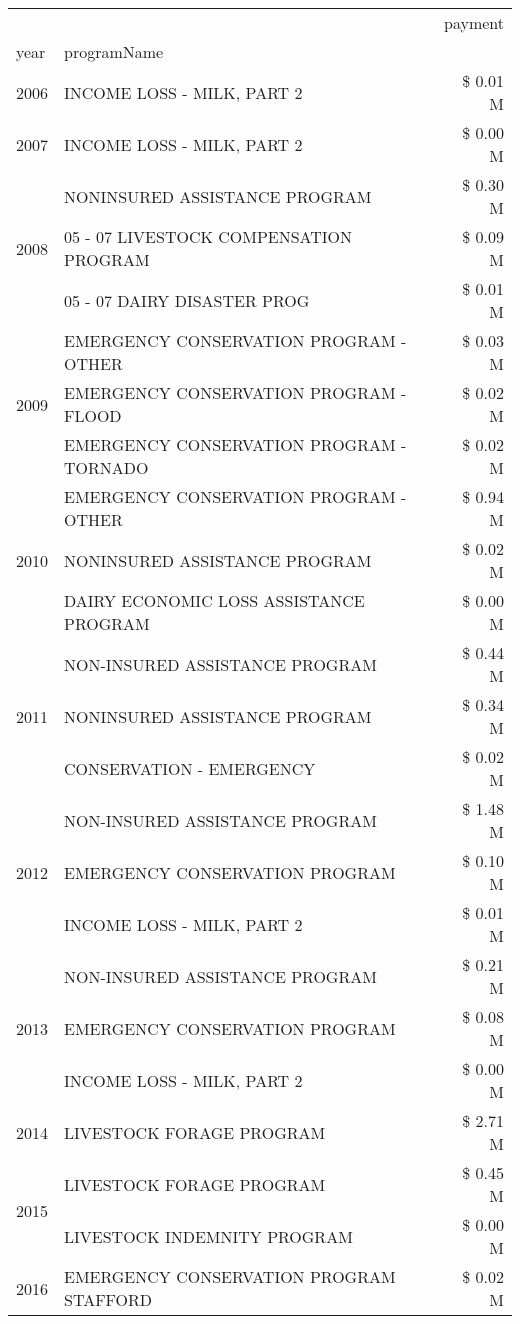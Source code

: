 \begin{tabular}{llr}
\toprule
 &  & payment \\
year & programName &  \\
\midrule
2006 & INCOME LOSS - MILK, PART 2 & \$ 0.01 M \\
\cline{1-3}
2007 & INCOME LOSS - MILK, PART 2 & \$ 0.00 M \\
\cline{1-3}
\multirow[t]{3}{*}{2008} & NONINSURED ASSISTANCE PROGRAM & \$ 0.30 M \\
 & 05 - 07 LIVESTOCK COMPENSATION PROGRAM & \$ 0.09 M \\
 & 05 - 07 DAIRY DISASTER PROG & \$ 0.01 M \\
\cline{1-3}
\multirow[t]{3}{*}{2009} & EMERGENCY CONSERVATION PROGRAM - OTHER & \$ 0.03 M \\
 & EMERGENCY CONSERVATION PROGRAM - FLOOD & \$ 0.02 M \\
 & EMERGENCY CONSERVATION PROGRAM - TORNADO & \$ 0.02 M \\
\cline{1-3}
\multirow[t]{3}{*}{2010} & EMERGENCY CONSERVATION PROGRAM - OTHER & \$ 0.94 M \\
 & NONINSURED ASSISTANCE PROGRAM & \$ 0.02 M \\
 & DAIRY ECONOMIC LOSS ASSISTANCE PROGRAM & \$ 0.00 M \\
\cline{1-3}
\multirow[t]{3}{*}{2011} & NON-INSURED ASSISTANCE PROGRAM & \$ 0.44 M \\
 & NONINSURED ASSISTANCE PROGRAM & \$ 0.34 M \\
 & CONSERVATION - EMERGENCY & \$ 0.02 M \\
\cline{1-3}
\multirow[t]{3}{*}{2012} & NON-INSURED ASSISTANCE PROGRAM & \$ 1.48 M \\
 & EMERGENCY CONSERVATION PROGRAM & \$ 0.10 M \\
 & INCOME LOSS - MILK, PART 2 & \$ 0.01 M \\
\cline{1-3}
\multirow[t]{3}{*}{2013} & NON-INSURED ASSISTANCE PROGRAM & \$ 0.21 M \\
 & EMERGENCY CONSERVATION PROGRAM & \$ 0.08 M \\
 & INCOME LOSS - MILK, PART 2 & \$ 0.00 M \\
\cline{1-3}
2014 & LIVESTOCK FORAGE PROGRAM & \$ 2.71 M \\
\cline{1-3}
\multirow[t]{2}{*}{2015} & LIVESTOCK FORAGE PROGRAM & \$ 0.45 M \\
 & LIVESTOCK INDEMNITY PROGRAM & \$ 0.00 M \\
\cline{1-3}
\multirow[t]{3}{*}{2016} & EMERGENCY CONSERVATION PROGRAM STAFFORD       & \$ 0.02 M \\

\end{tabular}
